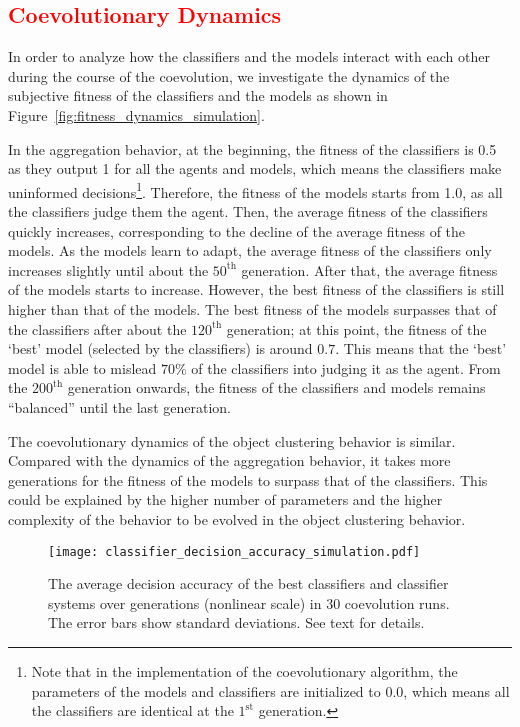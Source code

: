 \subsection{\textcolor{red}{Coevolutionary Dynamics}}\label{sec:coevolutionary_dynamics_simulation_swarm_simulation}
In order to analyze how the classifiers and the models interact with each other during the course of the coevolution, we investigate the dynamics of the subjective fitness of the classifiers and the models as shown in Figure~\ref{fig:fitness_dynamics_simulation}. 

In the aggregation behavior, at the beginning, the fitness of the classifiers is 0.5 as they output 1 for all the agents and models, which means the classifiers make uninformed decisions\footnote{Note that in the implementation of the coevolutionary algorithm, the parameters of the models and classifiers are initialized to $0.0$, which means all the classifiers are identical at the $1^{\mathrm{st}}$ generation.}. Therefore, the fitness of the models starts from 1.0, as all the classifiers judge them the agent. Then, the average fitness of the classifiers quickly increases, corresponding to the decline of the average fitness of the models. As the models learn to adapt, the average fitness of the classifiers only increases slightly until about the $50^{\mathrm{th}}$ generation. After that, the average fitness of the models starts to increase. However, the best fitness of the classifiers is still higher than that of the models. The best fitness of the models surpasses that of the classifiers after about the $120^{\mathrm{th}}$ generation; at this point, the fitness of the `best' model (selected by the classifiers) is around $0.7$. This means that the `best' model is able to mislead $70\%$ of the classifiers into judging it as the agent. From the $200^{\mathrm{th}}$ generation onwards, the fitness of the classifiers and models remains ``balanced'' until the last generation. 

The coevolutionary dynamics of the object clustering behavior is similar. Compared with the dynamics of the aggregation behavior, it takes more generations for the fitness of the models to surpass that of the classifiers. This could be explained by the higher number of parameters and the higher complexity of the behavior to be evolved in the object clustering behavior.

\begin{figure}[!t]
	\centering
	\texttt{[image: classifier\_decision\_accuracy\_simulation.pdf]}
	\caption{The average decision accuracy of the best classifiers and classifier systems over generations (nonlinear scale) in $30$ coevolution runs. The error bars show standard deviations. See text for details.}
	\label{fig:classifier_decision_accuracy_simulation}
\end{figure}

